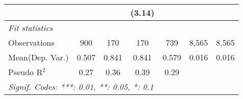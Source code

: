 \begin{tabular}{lcccccc}
                           &              &             & (3.14)        &             &       &   \\   
   \midrule
   \emph{Fit statistics}\\
   Observations            & 900          & 170         & 170           & 739         & 8,565 & 8,565\\  
Mean(Dep. Var.) & 0.507 & 0.841 & 0.841 & 0.579 & 0.016 & 0.016 \\
   Pseudo R$^2$            & 0.27         & 0.36        & 0.39          & 0.29        &       & \\  
   \midrule \midrule
   \multicolumn{7}{l}{\emph{Signif. Codes: ***: 0.01, **: 0.05, *: 0.1}}\\
\end{tabular}
\par\endgroup
